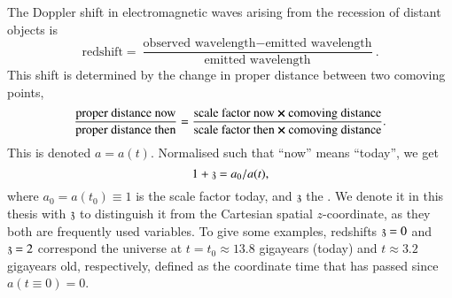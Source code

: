 

    The Doppler shift in electromagnetic waves arising from the recession of distant objects is %
    \begin{equation*}
        \text{redshift} = 
        \frac{\text{observed wavelength} - \text{emitted wavelength} }{\text{emitted wavelength} }.
    \end{equation*}
    This shift is determined by the change in proper distance between two comoving points, 
    \begin{equation*}
        \frac{\text{proper distance now}}{\text{proper distance then}} = \frac{\text{scale factor now}\cross \text{comoving distance}}{\text{scale factor then}\cross \text{comoving distance}}.
    \end{equation*}
    This  is denoted $a= a(t)$. Normalised such that ``now'' means ``today'', we get 
    \begin{equation}
        1 + \mathfrak{z} = a_0/a(t),
    \end{equation}
    where $a_0 = a(t_0)\equiv 1$ is the scale factor today, and $\mathfrak{z}$ the . 
    We denote it in this thesis with $\mathfrak{z}$ to distinguish it from the Cartesian spatial $z$-coordinate, as they both are frequently used variables. %
    To give some examples, redshifts $\mathfrak{z} = 0$ and $\mathfrak{z}=2$ correspond the universe at $t=t_0 \approx 13.8$ gigayears (today) and $t\approx 3.2$ gigayears old, respectively, defined as the coordinate time that has passed since $a(t\equiv 0)=0$.




